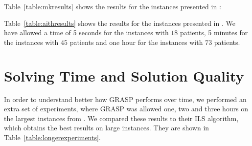 \documentclass[a4paper,11pt,authoryear]{elsarticle}
\begin{document}
\noindent Table~\ref{table:mkresults} shows the results for the instances presented in \cite{mankowska2014}:


\noindent Table~\ref{table:aithresults} shows the results for the instances presented in \cite{aithaddadene2016}. We have allowed a time of 5 seconds for the instances with $18$ patients, 5 minutes for the instances with $45$ patients and one hour for the instances with $73$ patients.



\section{Solving Time and Solution Quality}
\label{appendix:allowingextratime}
\noindent In order to understand better how GRASP performs over time, we performed an extra set of experiments, where GRASP was allowed one, two and three hours on the largest instances from \cite{aithaddadene2016}. We compared these results to their ILS algorithm, which obtains the best results on large instances. They are shown in Table~\ref{table:longerexperiments}.
\end{document}
